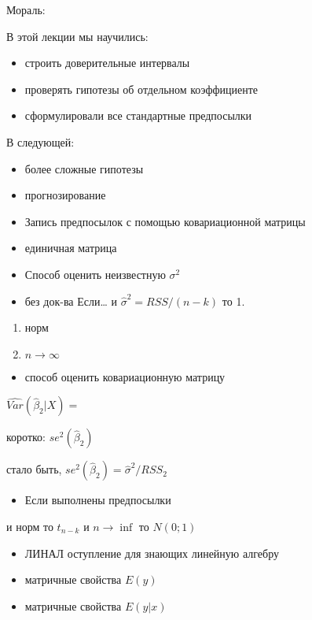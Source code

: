 \documentclass[ignorenonframetext,]{beamer}
\begin{document}
\begin{frame}{Мораль:}

В этой лекции мы научились:

\begin{itemize}
\item
  строить доверительные интервалы
\item
  проверять гипотезы об отдельном коэффициенте
\item
  сформулировали все стандартные предпосылки
\end{itemize}

В следующей:

\begin{itemize}
\item
  более сложные гипотезы
\item
  прогнозирование
\item
  Запись предпосылок с помощью ковариационной матрицы
\item
  единичная матрица
\item
  Способ оценить неизвестную $\sigma^2$
\item
  без док-ва Если\ldots{} и $\hat{\sigma}^2 = RSS/(n-k)$ то 1.
\end{itemize}

\begin{enumerate}
\def\labelenumi{\arabic{enumi}.}
\setcounter{enumi}{1}
\itemsep1pt\parskip0pt
\item
  норм
\item
  $n \to \infty$
\end{enumerate}

\begin{itemize}
\itemsep1pt\parskip0pt
\item
  способ оценить ковариационную матрицу
\end{itemize}

$\widehat{Var}(\hat{\beta}_2|X) =$

коротко: $se^2(\hat{\beta}_2)$

стало быть, $se^2(\hat{\beta}_2)=\hat{\sigma}^2/RSS_2$

\begin{itemize}
\itemsep1pt\parskip0pt
\item
  Если выполнены предпосылки
\end{itemize}

и норм то $t_{n-k}$ и $n\to\inf$ то $N(0;1)$

\begin{itemize}
\itemsep1pt\parskip0pt
\item
  ЛИНАЛ оступление для знающих линейную алгебру
\item
  матричные свойства $E(y)$
\item
  матричные свойства $E(y|x)$
\end{itemize}

\end{frame}
\end{document}
